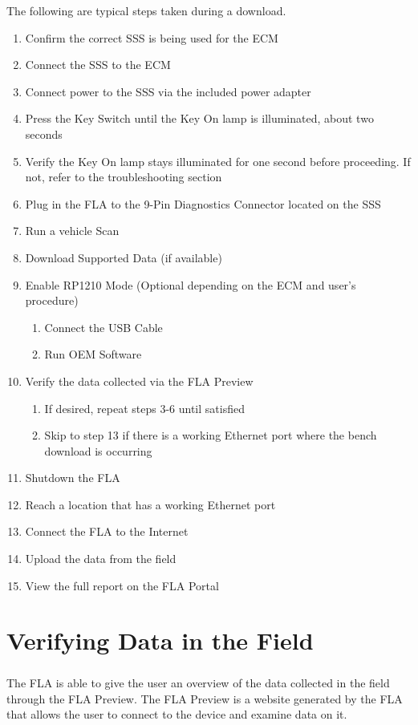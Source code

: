 \documentclass[11pt, oneside]{book}
\begin{document}
The following are typical steps taken during a download.
\begin{enumerate}
\item Confirm the correct SSS is being used for the ECM
\item Connect the SSS to the ECM
\item Connect power to the SSS via the included power adapter
\item Press the Key Switch until the Key On lamp is illuminated, about two
seconds
\item Verify the Key On lamp stays illuminated for one second before proceeding.
If not, refer to the troubleshooting section
\item Plug in the FLA to the 9-Pin Diagnostics Connector located on the
SSS
\item Run a vehicle Scan
\item Download Supported Data (if available)
\item Enable RP1210 Mode (Optional depending on the ECM and user's procedure)

\begin{enumerate}
\item Connect the USB Cable
\item Run OEM Software
\end{enumerate}
\item Verify the data collected via the FLA Preview

\begin{enumerate}
\item If desired, repeat steps 3-6 until satisfied
\item Skip to step 13 if there is a working Ethernet port where the bench
download is occurring
\end{enumerate}
\item Shutdown the FLA
\item Reach a location that has a working Ethernet port
\item Connect the FLA to the Internet
\item Upload the data from the field
\item View the full report on the FLA Portal
\end{enumerate}



\chapter{Verifying Data in the Field}
\paragraph{  }
The FLA is able to give the user an overview of the data collected in the field through the FLA Preview. The FLA Preview is a website generated by the FLA that allows the user to connect to the device and examine data on it.
\end{document}

